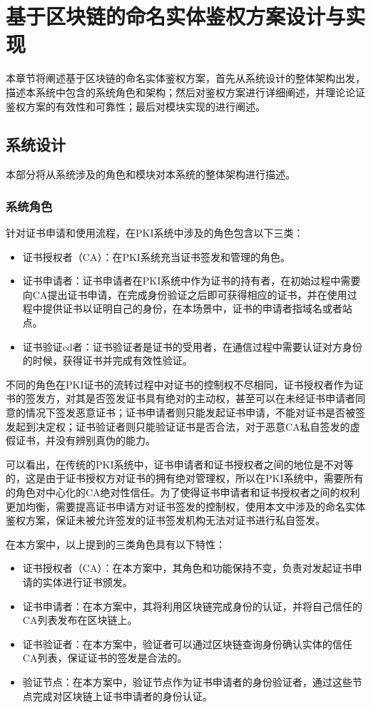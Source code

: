 
\chapter{基于区块链的命名实体鉴权方案设计与实现}

本章节将阐述基于区块链的命名实体鉴权方案，首先从系统设计的整体架构出发，描述本系统中包含的系统角色和架构；然后对鉴权方案进行详细阐述，并理论论证鉴权方案的有效性和可靠性；最后对模块实现的进行阐述。


\section{系统设计}

本部分将从系统涉及的角色和模块对本系统的整体架构进行描述。

\subsection{系统角色}

针对证书申请和使用流程，在PKI系统中涉及的角色包含以下三类：
\begin{itemize}
	\item 证书授权者（CA）：在PKI系统充当证书签发和管理的角色。
	\item 证书申请者：证书申请者在PKI系统中作为证书的持有者，在初始过程中需要向CA提出证书申请，在完成身份验证之后即可获得相应的证书，并在使用过程中提供证书以证明自己的身份，在本场景中，证书的申请者指域名或者站点。
	\item 证书验证cd者：证书验证者是证书的受用者，在通信过程中需要认证对方身份的时候，获得证书并完成有效性验证。
\end{itemize}

不同的角色在PKI证书的流转过程中对证书的控制权不尽相同，证书授权者作为证书的签发方，对其是否签发证书具有绝对的主动权，甚至可以在未经证书申请者同意的情况下签发恶意证书；证书申请者则只能发起证书申请，不能对证书是否被签发起到决定权；证书验证者则只能验证证书是否合法，对于恶意CA私自签发的虚假证书，并没有辨别真伪的能力。

可以看出，在传统的PKI系统中，证书申请者和证书授权者之间的地位是不对等的，这是由于证书授权方对证书的拥有绝对管理权，所以在PKI系统中，需要所有的角色对中心化的CA绝对性信任。为了使得证书申请者和证书授权者之间的权利更加均衡，需要提高证书申请方对证书签发的控制权，使用本文中涉及的命名实体鉴权方案，保证未被允许签发的证书签发机构无法对证书进行私自签发。

在本方案中，以上提到的三类角色具有以下特性：
\begin{itemize}
	\item 证书授权者（CA）：在本方案中，其角色和功能保持不变，负责对发起证书申请的实体进行证书颁发。
	\item 证书申请者：在本方案中，其将利用区块链完成身份的认证，并将自己信任的CA列表发布在区块链上。
	\item 证书验证者：在本方案中，验证者可以通过区块链查询身份确认实体的信任CA列表，保证证书的签发是合法的。
	\item 验证节点：在本方案中，验证节点作为证书申请者的身份验证者，通过这些节点完成对区块链上证书申请者的身份认证。
\end{itemize}

